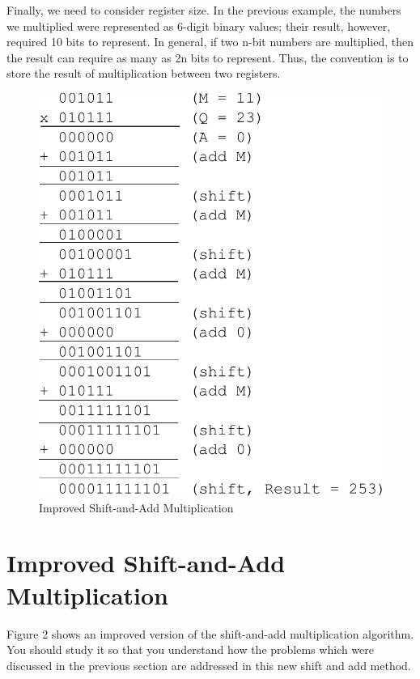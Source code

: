 \documentclass{article}
\begin{document}
Finally, we need to consider register size.
In the previous example, the numbers we multiplied were represented as 6-digit binary values; their result, however, required 10 bits to represent.
In general, if two n-bit numbers are multiplied, then the result can require as many as 2n bits to represent.
Thus, the convention is to store the result of multiplication between two registers.

\begin{figure}[h]
\centering
\includegraphics[scale=0.7]{isaam2.pdf}
\caption{Improved Shift-and-Add Multiplication}
\end{figure}

\pagebreak

\section{Improved Shift-and-Add Multiplication}
Figure 2 shows an improved version of the shift-and-add multiplication algorithm.
You should study it so that you understand how the problems which were discussed in the previous section are addressed in this new shift and add method.
\end{document}
